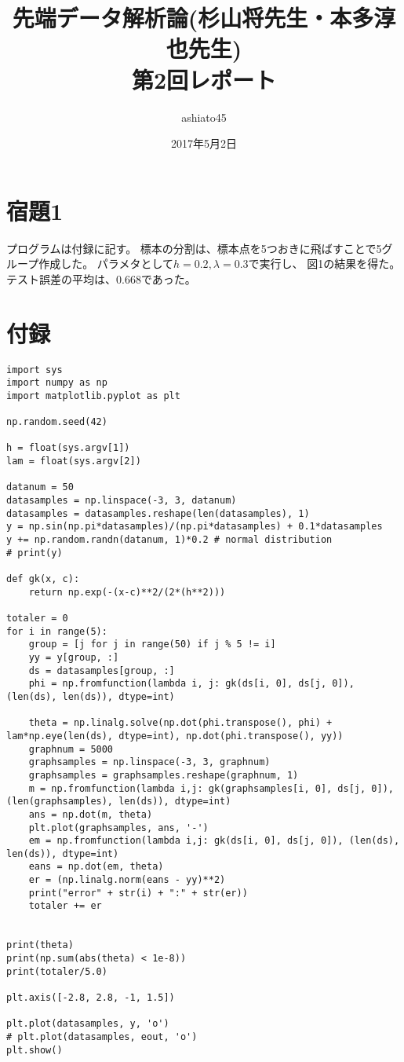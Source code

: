 \documentclass[9pt]{ltjsarticle}
\title{先端データ解析論(杉山将先生・本多淳也先生)\\第2回レポート}
\author{ashiato45}
\date{2017年5月2日}
\begin{document}
\maketitle

\section*{宿題1}
プログラムは付録に記す。
標本の分割は、標本点を5つおきに飛ばすことで5グループ作成した。
パラメタとして$h=0.2, \lambda=0.3$で実行し、
図1の結果を得た。テスト誤差の平均は、$0.668$であった。

\section*{付録}
\tiny
\begin{verbatim}
import sys
import numpy as np
import matplotlib.pyplot as plt

np.random.seed(42)

h = float(sys.argv[1])
lam = float(sys.argv[2])

datanum = 50
datasamples = np.linspace(-3, 3, datanum)
datasamples = datasamples.reshape(len(datasamples), 1)
y = np.sin(np.pi*datasamples)/(np.pi*datasamples) + 0.1*datasamples
y += np.random.randn(datanum, 1)*0.2 # normal distribution
# print(y)

def gk(x, c):
    return np.exp(-(x-c)**2/(2*(h**2)))

totaler = 0
for i in range(5):
    group = [j for j in range(50) if j % 5 != i]
    yy = y[group, :]
    ds = datasamples[group, :]
    phi = np.fromfunction(lambda i, j: gk(ds[i, 0], ds[j, 0]), (len(ds), len(ds)), dtype=int)

    theta = np.linalg.solve(np.dot(phi.transpose(), phi) + lam*np.eye(len(ds), dtype=int), np.dot(phi.transpose(), yy))
    graphnum = 5000
    graphsamples = np.linspace(-3, 3, graphnum)
    graphsamples = graphsamples.reshape(graphnum, 1)
    m = np.fromfunction(lambda i,j: gk(graphsamples[i, 0], ds[j, 0]), (len(graphsamples), len(ds)), dtype=int)
    ans = np.dot(m, theta)
    plt.plot(graphsamples, ans, '-')
    em = np.fromfunction(lambda i,j: gk(ds[i, 0], ds[j, 0]), (len(ds), len(ds)), dtype=int)
    eans = np.dot(em, theta)
    er = (np.linalg.norm(eans - yy)**2)
    print("error" + str(i) + ":" + str(er))
    totaler += er
    

print(theta)
print(np.sum(abs(theta) < 1e-8))
print(totaler/5.0)

plt.axis([-2.8, 2.8, -1, 1.5])    

plt.plot(datasamples, y, 'o')
# plt.plot(datasamples, eout, 'o')
plt.show()
\end{verbatim}
\end{document}
